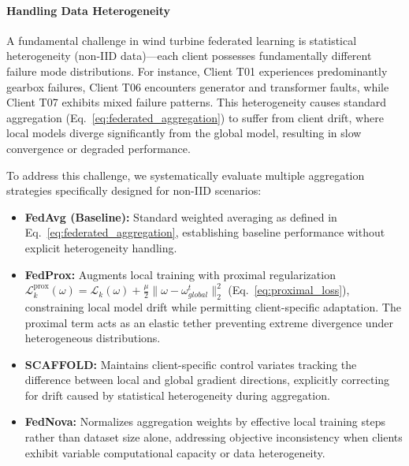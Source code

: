 \documentclass[12pt]{article}
\begin{document}
\begin{enumerate}
    \paragraph{Handling Data Heterogeneity}
    A fundamental challenge in wind turbine federated learning is statistical heterogeneity (non-IID data)—each client possesses fundamentally different failure mode distributions. For instance, Client T01 experiences predominantly gearbox failures, Client T06 encounters generator and transformer faults, while Client T07 exhibits mixed failure patterns. This heterogeneity causes standard aggregation (Eq.~\ref{eq:federated_aggregation}) to suffer from client drift, where local models diverge significantly from the global model, resulting in slow convergence or degraded performance.
    
    To address this challenge, we systematically evaluate multiple aggregation strategies specifically designed for non-IID scenarios:
    
    \begin{itemize}
        \item \textbf{FedAvg (Baseline):} Standard weighted averaging as defined in Eq.~\ref{eq:federated_aggregation}, establishing baseline performance without explicit heterogeneity handling.
        
        \item \textbf{FedProx:} Augments local training with proximal regularization $\mathcal{L}_k^{\text{prox}}(\omega) = \mathcal{L}_k(\omega) + \frac{\mu}{2}\|\omega - \omega_{global}^{t}\|_2^2$ (Eq.~\ref{eq:proximal_loss}), constraining local model drift while permitting client-specific adaptation. The proximal term acts as an elastic tether preventing extreme divergence under heterogeneous distributions.
        
        \item \textbf{SCAFFOLD:} Maintains client-specific control variates tracking the difference between local and global gradient directions, explicitly correcting for drift caused by statistical heterogeneity during aggregation.
        
        \item \textbf{FedNova:} Normalizes aggregation weights by effective local training steps rather than dataset size alone, addressing objective inconsistency when clients exhibit variable computational capacity or data heterogeneity.
    \end{itemize}
    

\end{enumerate}
\end{document}

